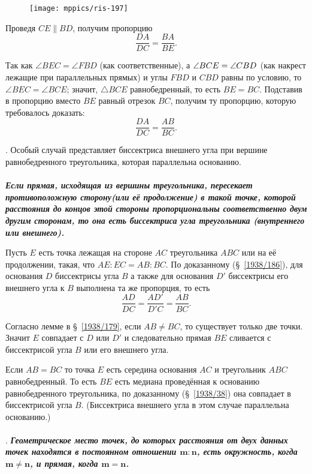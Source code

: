 \documentclass[twoside]{book}
\begin{document}
\begin{figure}
\centering
\texttt{[image: mppics/ris-197]}
\caption{}\label{1938/ris-197}
\end{figure}

Проведя $CE \parallel BD$, получим пропорцию
\[\frac{DA}{DC}=\frac{BA}{BE}.\]

Так как $\angle BEC=\angle FBD$ (как соответственные), а $\angle BCE\z=\angle CBD$ (как накрест лежащие при параллельных прямых) и углы $FBD$ и $CBD$ равны по условию, то $\angle BEC=\angle BCE$;
значит, $\triangle BCE$ равнобедренный, то есть $BE=BC$.
Подставив в пропорцию вместо $BE$ равный отрезок $BC$, получим ту пропорцию, которую требовалось доказать:
\[\frac{DA}{DC}=\frac{AB}{BC}.\]

\smallskip
{}.
Особый случай представляет биссектриса внешнего угла при вершине равнобедренного треугольника, которая параллельна основанию.

\paragraph{}\label{1914/227}
\textbf{\emph{Если прямая, исходящая из вершины треугольника, пересекает противоположную сторону(или её продолжение) в такой точке, которой расстояния до концов этой стороны пропорциональны соответственно двум другим сторонам, то она есть биссектриса угла треугольника (внутреннего или внешнего).}}

Пусть  $E$ есть точка лежащая на стороне $AC$ треугольника $ABC$ или на её продолжении, такая, что
$AE:EC=AB:BC$.
По доказанному (§~\ref{1938/186}), для основания $D$ биссектрисы угла $B$ а также для основания $D'$ биссектрисы его внешнего угла к $B$ выполнена та же пропорция, то есть
\[\frac{AD}{DC}=\frac{AD'}{D'C}=\frac{AB}{BC}.\]

Согласно лемме в §~\ref{1938/179}, если $AB\ne BC$, то существует только две точки.
Значит $E$ совпадает с $D$ или $D'$ и следовательно прямая $BE$ сливается с биссектрисой угла $B$ или его внешнего угла.

Если $AB=BC$ то точка $E$ есть середина основания $AC$ и треугольник $ABC$ равнобедренный. 
То есть $BE$ есть медиана проведённая к основанию равнобедренного треугольника,
по доказанному (§~\ref{1938/38}) она совпадает в биссектрисой угла $B$.
(Биссектриса внешнего угла в этом случае параллельна основанию.)


\paragraph{}\label{1914/228}
.
\textbf{\emph{Геометрическое место точек, до которых расстояния от двух данных точек находятся в постоянном отношении $\bm{m:n}$, есть окружность, когда $\bm{m\ne n}$, и прямая, когда $\bm{m=n}$.}}
\end{document}
